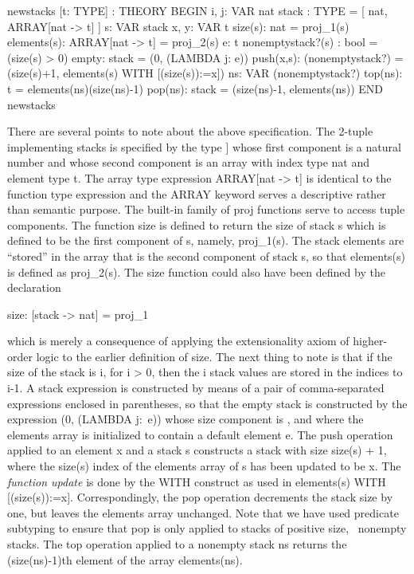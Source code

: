\begin{pvsex}
  newstacks [t: TYPE] : THEORY 
   BEGIN
    i, j: VAR nat
    stack : TYPE = [ nat, ARRAY[nat -> t] ]
    s: VAR stack
    x, y: VAR t
    size(s): nat = proj\_1(s)
    elements(s): ARRAY[nat -> t] = proj\_2(s)
    e: t
    nonemptystack?(s) : bool = (size(s) > 0)
    empty: stack = (0, (LAMBDA j: e))
    push(x,s): (nonemptystack?) =
      (size(s)+1, elements(s) WITH [(size(s)):=x])
    ns: VAR (nonemptystack?)
    top(ns): t = elements(ns)(size(ns)-1)
    pop(ns): stack = (size(ns)-1, elements(ns))
   END newstacks 
\end{pvsex}
%
There are several points to note about the above specification.  The
2-tuple implementing stacks is specified by the type {\stt [nat, ARRAY
[nat -> t]]} whose first component is a natural number and whose
second component is an array with index type {\stt nat} and element
type {\stt t}.  The array type expression {\stt ARRAY[nat -> t]} is
identical to the function type expression {\stt [nat -> t]} and the
{\stt ARRAY} keyword serves a descriptive rather than semantic
purpose.  The built-in family of {\stt proj} functions serve to access
tuple components.  The function {\stt size} is defined to return the
size of stack {\stt s} which is defined to be the first component of
{\stt s}, namely, {\stt proj\_1(s)}.  The stack elements are
``stored'' in the array that is the second component of stack {\stt
s}, so that {\stt elements(s)} is defined as {\stt proj\_2(s)}.  The
{\stt size} function could also have been defined by the declaration
\begin{pvsex}
  size: [stack -> nat] = proj\_1
\end{pvsex}
%
which is merely a consequence of applying the extensionality axiom of
higher-order logic to the earlier definition of {\stt size}.  The next
thing to note is that if the size of the stack is {\stt i}, for {\stt i >
0}, then the {\stt i} stack values are stored in the indices {} to
{\stt i-1}.  A stack expression is constructed by means of a pair of
comma-separated expressions enclosed in parentheses, so that the empty
stack is constructed by the expression {\stt (0, (LAMBDA j:\ e))} whose
size component is {}, and where the {\stt elements} array is
initialized to contain a default element {\stt e}.  The {\stt push}
operation applied to an element {\stt x} and a stack {\stt s} constructs a
stack with size {\stt size(s) + 1}, where the {\stt size(s)} index of the
{\stt elements} array of {\stt s} has been updated to be {\stt x}.  The
{\em function update\/} is done by the {\stt WITH} construct as used in
{\stt elements(s) WITH [(size(s)):=x]}.  Correspondingly, the {\stt pop}
operation decrements the stack size by one, but leaves the {\stt
elements} array unchanged.  Note that we have used predicate subtyping
to ensure that {\stt pop} is only applied to stacks of positive size,
\ie\ nonempty stacks.  The {\stt top} operation applied to a nonempty
stack {\stt ns} returns the {\stt (size(ns)-1)}th element of the array
{\stt elements(ns)}.

